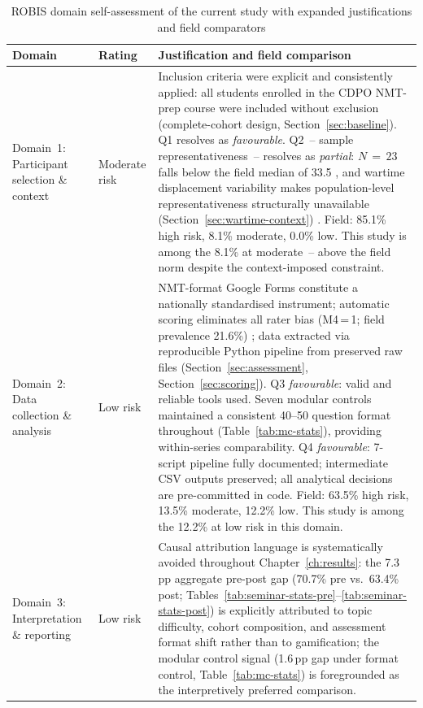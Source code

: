 \begin{table}[!h]
\centering
\caption{ROBIS domain self-assessment of the current study with expanded justifications and field comparators}
\label{tab:self-assessment}
\footnotesize
\begin{tabular}{llp{9cm}}
\hline
\textbf{Domain} & \textbf{Rating} & \textbf{Justification and field comparison} \\
\hline
Domain~1: Participant selection \& context & Moderate risk &
Inclusion criteria were explicit and consistently applied: all students enrolled in the CDPO NMT-prep course were included without exclusion (complete-cohort design, Section~\ref{sec:baseline}).
Q1 resolves as \emph{favourable}. Q2~-- sample representativeness~-- resolves as \emph{partial}: $N\,{=}\,23$ falls below the field median of 33.5 \cite{Korniienko2025mrqs}, and wartime displacement variability makes population-level representativeness structurally unavailable (Section~\ref{sec:wartime-context}) \cite{Burde2017}.
Field: 85.1\% high risk, 8.1\% moderate, 0.0\% low. This study is among the 8.1\% at moderate~-- above the field norm despite the context-imposed constraint. \\
\hline
Domain~2: Data collection \& analysis & Low risk &
NMT-format Google Forms constitute a nationally standardised instrument; automatic scoring eliminates all rater bias (M4\,=\,1; field prevalence 21.6\%) \cite{Korniienko2025mrqs}; data extracted via reproducible Python pipeline from preserved raw files (Section~\ref{sec:assessment}, Section~\ref{sec:scoring}).
Q3 \emph{favourable}: valid and reliable tools used. Seven modular controls maintained a consistent 40--50 question format throughout (Table~\ref{tab:mc-stats}), providing within-series comparability. Q4 \emph{favourable}: 7-script pipeline fully documented; intermediate CSV outputs preserved; all analytical decisions are pre-committed in code.
Field: 63.5\% high risk, 13.5\% moderate, 12.2\% low. This study is among the 12.2\% at low risk in this domain. \\
\hline
Domain~3: Interpretation \& reporting & Low risk &
Causal attribution language is systematically avoided throughout Chapter~\ref{ch:results}: the 7.3\,pp aggregate pre-post gap (70.7\% pre vs.\ 63.4\% post; Tables~\ref{tab:seminar-stats-pre}--\ref{tab:seminar-stats-post}) is explicitly attributed to topic difficulty, cohort composition, and assessment format shift rather than to gamification; the modular control signal (1.6\,pp gap under format control, Table~\ref{tab:mc-stats}) is foregrounded as the interpretively preferred comparison.

\end{tabular}
\end{table}

